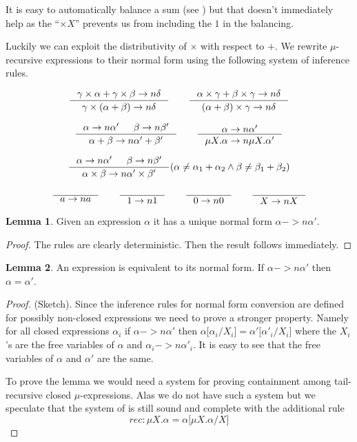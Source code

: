 \documentclass[a4paper, oneside]{memoir}
\let\fref\undefined
\theoremstyle{definition}
\newtheorem{lemma}{Lemma}
\begin{document}
It is easy to automatically balance a sum (see \fref{sec:sum-balancing-using})
but that doesn't immediately help as the ``$\times X$'' prevents us from
including the $1$ in the balancing.

Luckily we can exploit the distributivity of $\times$ with respect to $+$. We
rewrite $\mu$-recursive expressions to their normal form using the following
system of inference rules.

\[
\inference{\gamma \times \alpha + \gamma \times \beta ->n \delta}{\gamma \times
  (\alpha + \beta) ->n \delta} \qquad
\inference{\alpha \times \gamma + \beta \times \gamma ->n \delta}{(\alpha +
  \beta) \times \gamma ->n \delta}
\]

\[
\inference{\alpha ->n \alpha' & \beta ->n \beta'}{\alpha + \beta ->n \alpha' +
  \beta'} \qquad
\inference{\alpha ->n \alpha'}{\mu X. \alpha ->n \mu X. \alpha'}
\]

\[
\inference{\alpha ->n \alpha' & \beta ->n \beta'}{\alpha \times \beta ->n \alpha'
  \times \beta'}(\alpha \neq \alpha_1 + \alpha_2 \land \beta \neq \beta_1 + \beta_2)
\]

\[
\inference{}{a ->n a} \qquad
\inference{}{1 ->n 1} \qquad
\inference{}{0 ->n 0} \qquad
\inference{}{X ->n X}
\]

\begin{lemma}
  Given an expression $\alpha$ it has a unique normal form $\alpha ->n \alpha'$.
  \begin{proof}
    The rules are clearly deterministic. Then the result follows immediately.
  \end{proof}
\end{lemma}

\begin{lemma}
  An expression is equivalent to its normal form. If $\alpha ->n \alpha'$ then
  $\alpha = \alpha'$.
  \begin{proof} (Sketch).
    Since the inference rules for normal form conversion are defined for
    possibly non-closed expressions we need to prove a stronger property. Namely
    for all closed expressions $\alpha_i$ if $\alpha ->n \alpha'$ then $\alpha
    \lbrack \alpha_i / X_i \rbrack = \alpha' \lbrack \alpha'_i / X_i \rbrack$
    where the $X_i$'s are the free variables of $\alpha$ and $\alpha_i ->n
    \alpha'_i$. It is easy to see that the free variables of $\alpha$ and
    $\alpha'$ are the same.

    To prove the lemma we would need a system for proving containment among
    tail-recursive closed $\mu$-expressions. Alas we do not have such a system
    but we speculate that the system of \cite{heli} is still sound and complete
    with the additional rule
    \[
    rec : \mu X. \alpha = \alpha \lbrack \mu X. \alpha / X \rbrack
    \]
  \end{proof}
\end{lemma}
\end{document}
